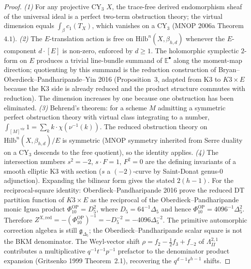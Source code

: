 \begin{proof}
\emph{(1)} For any projective CY$_3$ $X$, the trace-free derived
endomorphism sheaf of the universal ideal is a perfect two-term
obstruction theory; the virtual dimension equals
$\int_{\beta}c_1(T_X)$, which vanishes on a CY$_3$ (MNOP 2006a
Theorem~$4.1$).
\emph{(2)} The $E$-translation action is free on
$\mathrm{Hilb}^n(X,\beta_{h,d})$ whenever the $E$-component
$d\cdot[E]$ is non-zero, enforced by $d\ge 1$. The holomorphic
symplectic $2$-form on $E$ produces a trivial line-bundle summand of
$\mathbb E^\bullet$ along the moment-map direction; quotienting by this
summand is the reduction construction of
Bryan--Oberdieck--Pandharipande--Yin 2016 (Proposition~$3$, adapted
from K3 to $K3\times E$ because the K3 side is already reduced and the
product structure commutes with reduction). The dimension increases
by one because one obstruction has been eliminated.
\emph{(3)} Behrend's theorem: for a scheme $M$ admitting a symmetric
perfect obstruction theory with virtual class integrating to a
number, $\int_{[M]^{\mathrm{vir}}}1 = \sum_k k\cdot\chi(\nu^{-1}(k))$.
The reduced obstruction theory on $\mathrm{Hilb}^n(X,\beta_{h,d})/E$
is symmetric (MNOP symmetry inherited from Serre duality on a CY$_3$
descends to the free quotient), so the identity applies.
\emph{(4)} The intersection numbers $s^2=-2$, $s\cdot F=1$, $F^2=0$
are the defining invariants of a smooth elliptic K3 with section
($s$ a $(-2)$-curve by Saint-Donat genus-$0$ adjunction). Expanding
the bilinear form gives the stated $2(h-1)$. For the
reciprocal-square identity: Oberdieck--Pandharipande 2016 prove the
reduced DT partition function of $K3\times E$ as the reciprocal of the
Oberdieck--Pandharipande monic Igusa product
$\Phi_{10}^{\mathrm{OP}}=D_5^2$, where
$D_5=64^{-1}\Delta_5$ and hence
$\Phi_{10}^{\mathrm{OP}}=4096^{-1}\Delta_5^2$. Therefore
$Z^{X,\mathrm{red}}=-(\Phi_{10}^{\mathrm{OP}})^{-1}
=-D_5^{-2}=-4096\Delta_5^{-2}$. The primitive automorphic correction algebra is
still $\mathfrak g_{\Delta_5}$; the Oberdieck--Pandharipande scalar square is not the BKM
denominator. The Weyl-vector shift
$\rho = f_2 - \tfrac12 f_3 + f_{-2}$ of
$\Lambda^{2,1}_{II}$ contributes a multiplicative $q^{-1}t^{-1}p^{-1}$
prefactor to the denominator product expansion (Gritsenko 1999
Theorem~2.1), recovering the $q^{d-1}t^{h-1}$ shifts.
\end{proof}

